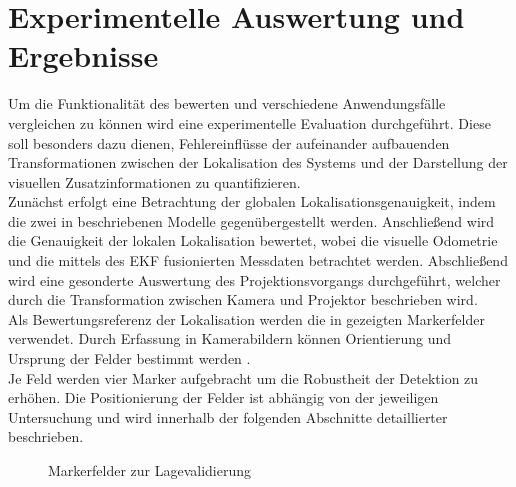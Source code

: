 \chapter{Experimentelle Auswertung und Ergebnisse}
\label{chap.results}

Um die Funktionalität des  bewerten und verschiedene Anwendungsfälle vergleichen zu können wird eine experimentelle Evaluation durchgeführt. Diese soll besonders dazu dienen, Fehlereinflüsse der aufeinander aufbauenden Transformationen zwischen der Lokalisation des Systems und der Darstellung der visuellen Zusatzinformationen zu quantifizieren.\\

Zunächst erfolgt eine Betrachtung der globalen Lokalisationsgenauigkeit, indem die zwei in  beschriebenen Modelle gegenübergestellt werden. Anschließend wird die Genauigkeit der lokalen Lokalisation bewertet, wobei die visuelle Odometrie und die mittels des EKF fusionierten Messdaten betrachtet werden. Abschließend wird eine gesonderte Auswertung des Projektionsvorgangs durchgeführt, welcher durch die Transformation zwischen Kamera und Projektor beschrieben wird.\\

Als Bewertungsreferenz der Lokalisation werden die in  gezeigten Markerfelder verwendet. Durch Erfassung in Kamerabildern können Orientierung und Ursprung der Felder bestimmt werden \cite{arsys}.\\
Je Feld werden vier Marker aufgebracht um die Robustheit der Detektion zu erhöhen. Die Positionierung der Felder ist abhängig von der jeweiligen Untersuchung und wird innerhalb der folgenden Abschnitte detaillierter beschrieben.\\

\begin{figure}[!ht]
	\begin{center}
	
	\hspace{5mm}
	\caption{Markerfelder zur Lagevalidierung}
	\label{fig.armarker}
	\end{center}
\end{figure}

